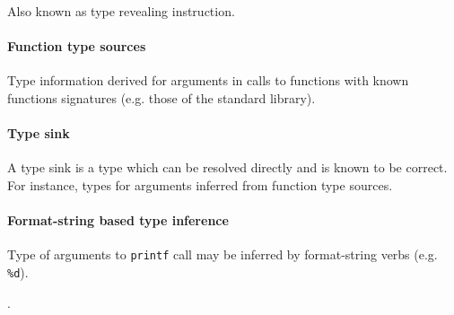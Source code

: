 Also known as type revealing instruction.



\paragraph{Function type sources}

Type information derived for arguments in calls to functions with known functions signatures (e.g. those of the standard library). \cite{type_inference_on_executables}


\paragraph{Type sink}

A type sink is a type which can be resolved directly and is known to be correct. For instance, types for arguments inferred from function type sources.


\paragraph{Format-string based type inference}


Type of arguments to \texttt{printf} call may be inferred by format-string verbs (e.g. \texttt{\%d}).

.
